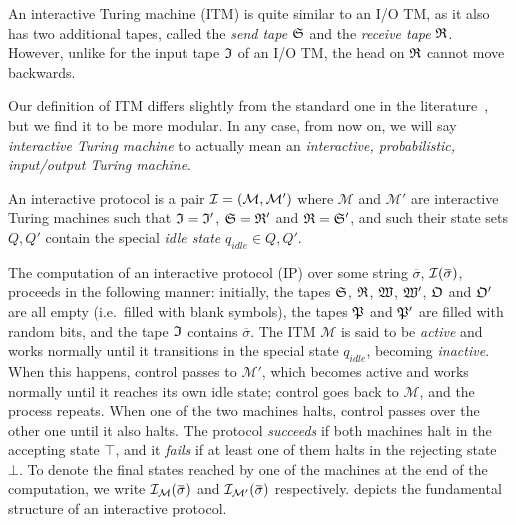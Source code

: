 An interactive Turing machine (ITM) is quite similar to an I/O TM, as it also has two additional 
tapes, called the \emph{send tape} \(\mathfrak{S} \) and the \emph{receive tape} \(\mathfrak{R} \).
However, unlike for the input tape \(\mathfrak{I} \) of an I/O TM, the head on \(\mathfrak{R} \) cannot move 
backwards.
\begin{remark}  
  Our definition of ITM differs slightly from the standard one in the 
  literature~\cite{GoldreichMW1991,GoldwasserMR1989}, but we find it to be more modular.
  In any case, from now on, we will say \emph{interactive Turing machine} to actually mean an 
 \emph{interactive, probabilistic, input/output Turing machine}.
\end{remark}

\begin{definition}
  An interactive protocol is a pair \(\mathcal{I} = \left(\mathcal{M}, \mathcal{M'}\right)\)
  where \(\mathcal{M}\) and \(\mathcal{M'}\) are interactive Turing machines such that 
  \(\mathfrak{I} = \mathfrak{I}'\), \(\mathfrak{S} = \mathfrak{R}' \) and \(\mathfrak{R} = \mathfrak{S}'\), and such their 
  state sets \(Q, Q'\) contain the special \emph{idle state} \(q_{idle} \in Q, Q'\).
\end{definition}

The computation of an interactive protocol (IP) over some string \(\overbar{\sigma}\), 
\(\call{\mathcal{I}}{\overbar{\sigma}}\), proceeds in the following manner: 
initially, the tapes \(\mathfrak{S} \), \(\mathfrak{R} \), \(\mathfrak{W} \), \(\mathfrak{W}' \), \(\mathfrak{O} \) 
and \(\mathfrak{O}' \) are all empty (i.e.\ filled with blank symbols), the tapes \(\mathfrak{P} \) and 
\(\mathfrak{P}' \) are filled with random bits, and the tape \(\mathfrak{I} \) contains \(\overbar{\sigma}\).
The ITM \(\mathcal{M}\) is said to be \emph{active} and works normally until it transitions in the 
special state \(q_{idle}\), becoming \emph{inactive}.
When this happens, control passes to \(\mathcal{M}'\), which becomes active and works normally 
until it reaches its own idle state; control goes back to \(\mathcal{M}\), and the process repeats.
When one of the two machines halts, control passes over the other one until it also halts.
The protocol \emph{succeeds} if both machines halt in the accepting state \(\top \), and it 
\emph{fails} if at least one of them halts in the rejecting state \(\bot \).
To denote the final states reached by one of the machines at the end of the computation, 
we write \(\call{\mathcal{I}_{\mathcal{M}}}{\overbar{\sigma}}\) and 
\(\call{\mathcal{I}_{\mathcal{M}'}}{\overbar{\sigma}}\) respectively.
 depicts the fundamental structure of an interactive protocol.

